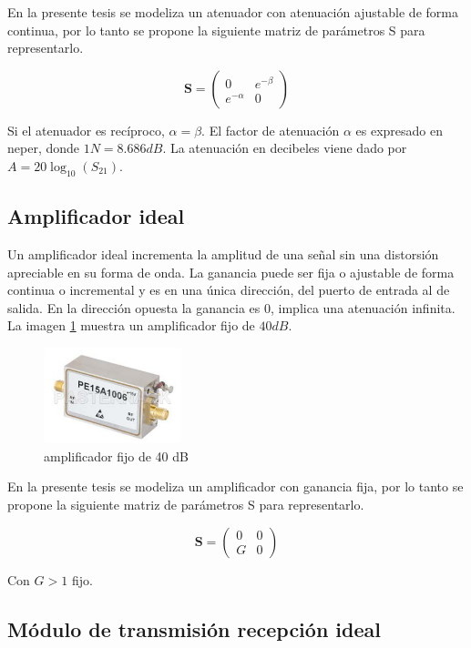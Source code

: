 En la presente tesis se modeliza un atenuador con atenuación ajustable de forma continua, por lo tanto se propone la siguiente
matriz de parámetros S para representarlo.

$$
\mathbf{S} = \begin{pmatrix} 0 & e^{-\beta}\\e^{-\alpha} & 0\end{pmatrix}
$$

Si el atenuador es recíproco, $\alpha = \beta$. El factor de atenuación $\alpha$ es expresado en neper, donde $1N = 8.686dB$.
La atenuación en decibeles viene dado por $A = 20\log_{10}(S_{21})$. 


\subsection{Amplificador ideal}

Un amplificador ideal incrementa la amplitud de una señal sin una distorsión apreciable en su forma de onda. La ganancia puede
ser fija o ajustable de forma continua o incremental \cite{Standard1996} y es en una única dirección, del puerto de entrada al
de salida. En la dirección opuesta la ganancia es 0, implica una atenuación infinita. La imagen \ref{fig:amplifier} muestra un
amplificador fijo de $40 dB$.

\begin{figure}[H]
 \centering
 \includegraphics[width=4cm]{gfx/amplifier.png}
 \caption{amplificador fijo de 40 dB \cite{Pasternack2014}}
 \label{fig:amplifier}
\end{figure}

En la presente tesis se modeliza un amplificador con ganancia fija, por lo tanto se propone la siguiente matriz de parámetros S
para representarlo.

$$
\mathbf{S} = \begin{pmatrix} 0 & 0\\G & 0\end{pmatrix}
$$

Con $G > 1$ fijo.


\subsection{Módulo de transmisión recepción ideal}

